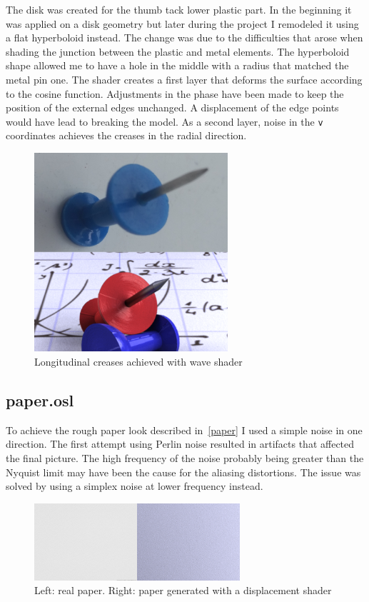 \documentclass[tog]{acmsiggraph}
\begin{document}
The disk was created for the thumb tack lower plastic part. In the beginning it was applied on a disk geometry but later during the project I remodeled it using a flat hyperboloid instead. The change was due to the difficulties that arose when shading the junction between the plastic and metal elements. The hyperboloid shape allowed me to have a hole in the middle with a radius that matched the metal pin one. The shader creates a first layer that deforms the surface according to the cosine function. Adjustments in the phase have been made to keep the position of the external edges unchanged. A displacement of the edge points would have lead to breaking the model. As a second layer, noise in the \texttt{v} coordinates achieves the creases in the radial direction.

\begin{figure}[ht]
  \centering
  \includegraphics[height=2.9in]{images/disk.png}
  \caption{Longitudinal creases achieved with wave shader}
  \label{fig:disk}
\end{figure}

\subsection{paper.osl}

To achieve the rough paper look described in~\ref{paper} I used a simple noise in one direction. The first attempt using Perlin noise resulted in artifacts that affected the final picture. The high frequency of the noise probably being greater than the Nyquist limit may have been the cause for the aliasing distortions. The issue was solved by using a simplex noise at lower frequency instead.

\begin{figure}[ht]
  \centering
  \includegraphics[width=3.0in]{images/paper.png}
  \caption{Left: real paper. Right: paper generated with a displacement shader}
  \label{fig:paper}
\end{figure}
\end{document}

